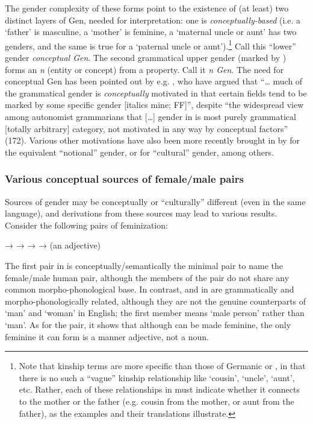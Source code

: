 The gender complexity of these forms point to the existence of (at least) two
distinct layers of Gen, needed for interpretation: one is \textit{conceptually-based}
(i.e. a `father' is masculine, a `mother' is feminine, a `maternal uncle
or aunt' has two genders, and the same is true for a `paternal uncle or
aunt').\footnote{Note that  kinship terms are more specific than those of
Germanic or , in that there is no such a ``vague'' kinship relationship
like `cousin', `uncle', `aunt', etc. Rather, each of these relationships
in  must indicate whether it connects to the mother or the father (e.g.
cousin from the mother, or aunt from the father), as the examples and their
translations illustrate.} Call this ``lower'' gender \textit{conceptual Gen}. The
second grammatical upper gender (marked by ) forms an \textit{n}
(entity or concept) from a property. Call it \textit{n Gen}. The need for
conceptual Gen has been pointed out by e.g. \citet{Kopcke2010}, who have argued
that ``\dots{} much of the  grammatical gender is \textit{conceptually}
motivated in that certain  fields tend to be marked by some specific
gender [italics mine; FF]'', despite ``the widespread view among autonomist
grammarians that [\dots{}] gender in  is most purely grammatical [totally
arbitrary] category, not motivated in any way by conceptual factors'' (172). 
Various other motivations have also been more recently brought in by
\citet{McConnellGinet2015} for the equivalent ``notional'' gender, or
\citet{Mithun2015} for ``cultural'' gender, among others.

\subsubsection{Various conceptual sources of female/male pairs}

Sources of gender may be conceptually or ``culturally'' different (even in the
same language), and derivations from these sources may lead to various results.
Consider the following pairs of feminization:

\begin{exe}
  \ex\label{ex:fassi:32}  → 
  \ex\label{ex:fassi:33}  → 
  \ex\label{ex:fassi:34}  → 
  \ex\label{ex:fassi:35}  →  (an adjective)
\end{exe}
%
The first pair in  is conceptually/semantically the minimal
pair to name the female/male human pair, although the members of the pair do
not share any common morpho-phonological base. In contrast,  and
 in  are grammatically and morpho-phonologically
related, although they are not the genuine counterparts of `man' and `woman' in
English; the first member means `male person' rather than `man'. As for the
 pair, it shows that although  can be made feminine,
the only feminine it can form is a manner adjective, not a noun.


